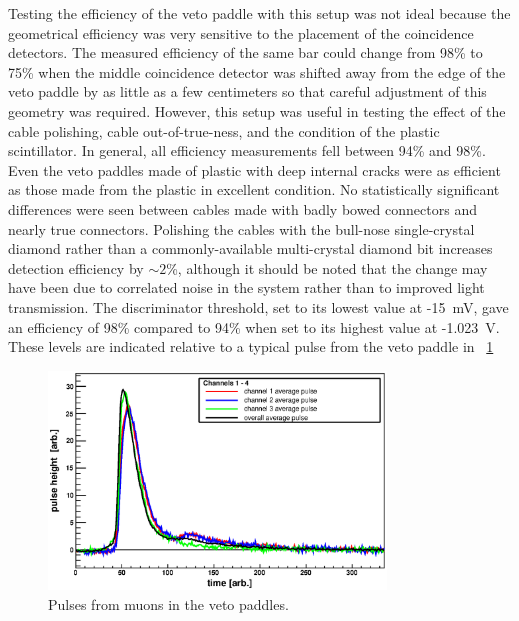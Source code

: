 Testing the efficiency of the veto paddle with this setup was not ideal because the geometrical efficiency was very sensitive to the placement of the coincidence detectors.  The measured efficiency of the same bar could change from 98\% to 75\% when the middle coincidence detector was shifted away from the edge of the veto paddle by as little as a few centimeters so that careful adjustment of this geometry was required.  However, this setup was useful in testing the effect of the cable polishing, cable out-of-true-ness, and the condition of the plastic scintillator.  In general, all efficiency measurements fell between 94\% and 98\%.  Even the veto paddles made of plastic with deep internal cracks were as efficient as those made from the plastic in excellent condition.  No statistically significant differences were seen between cables made with badly bowed connectors and nearly true connectors.  Polishing the cables with the bull-nose single-crystal diamond rather than a commonly-available multi-crystal diamond bit increases detection efficiency by $\sim2$\%, although it should be noted that the change may have been due to correlated noise in the system rather than to improved light transmission.  The discriminator threshold, set to its lowest value at -15~mV, gave an efficiency of 98\% compared to 94\% when set to its highest value at -1.023~V.  These levels are indicated relative to a typical pulse from the veto paddle in {\fig}~\ref{fig:vetoSignal}
\begin{figure}[!htbp]
\centering
\includegraphics[width=0.8\textwidth]{figures/PulseChan_1_4.eps}
\caption{Pulses from muons in the veto paddles.}
\label{fig:vetoSignal}
\end{figure}

